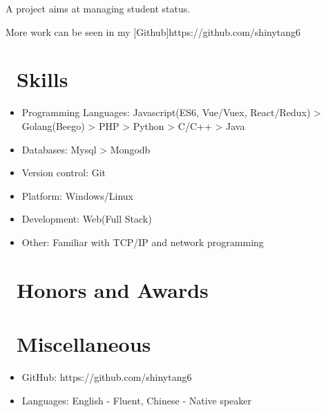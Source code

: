 \documentclass{resume}
\begin{document}
A project aims at managing student status.

More work can be seen in my [Github]{https://github.com/shinytang6}

\section{\faCogs\ Skills}
\begin{itemize}[parsep=0.5ex]
  \item Programming Languages: Javascript(ES6, Vue/Vuex, React/Redux) > Golang(Beego) > PHP > Python > C/C++ > Java
  \item Databases: Mysql > Mongodb
  \item Version control: Git
  \item Platform: Windows/Linux
  \item Development: Web(Full Stack)
  \item Other: Familiar with TCP/IP and network programming
\end{itemize}

\section{\faHeartO\ Honors and Awards}

\section{\faInfo\ Miscellaneous}
\begin{itemize}[parsep=0.5ex]
  \item GitHub: https://github.com/shinytang6
  \item Languages: English - Fluent, Chinese - Native speaker
\end{itemize}

%
%
\end{document}
